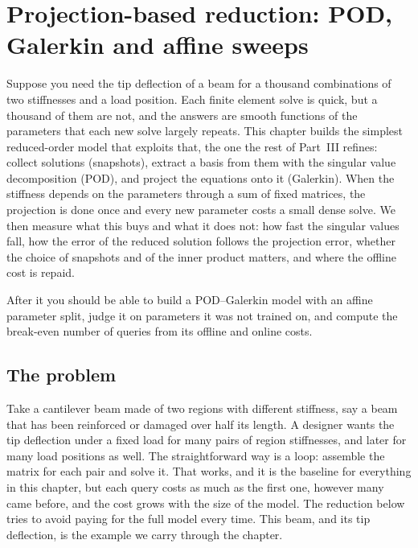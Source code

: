 \chapter{Projection-based reduction: POD, Galerkin and affine sweeps}\label{ch:pod}

\begin{tcolorbox}[colback=hpale,colframe=hnavy!60,coltitle=white,colbacktitle=hnavy!85,title={In this chapter}]
Suppose you need the tip deflection of a beam for a thousand combinations of two stiffnesses and a load position. Each finite element solve is quick, but a thousand of them are not, and the answers are smooth functions of the parameters that each new solve largely repeats. This chapter builds the simplest reduced-order model that exploits that, the one the rest of Part~III refines: collect solutions (snapshots), extract a basis from them with the singular value decomposition (POD), and project the equations onto it (Galerkin). When the stiffness depends on the parameters through a sum of fixed matrices, the projection is done once and every new parameter costs a small dense solve. We then measure what this buys and what it does not: how fast the singular values fall, how the error of the reduced solution follows the projection error, whether the choice of snapshots and of the inner product matters, and where the offline cost is repaid.\par\smallskip
After it you should be able to build a POD--Galerkin model with an affine parameter split, judge it on parameters it was not trained on, and compute the break-even number of queries from its offline and online costs.
\end{tcolorbox}

\section{The problem}\label{sec:pod-problem}

Take a cantilever beam made of two regions with different stiffness, say a beam that has been reinforced or damaged over half its length. A designer wants the tip deflection under a fixed load for many pairs of region stiffnesses, and later for many load positions as well. The straightforward way is a loop: assemble the matrix for each pair and solve it. That works, and it is the baseline for everything in this chapter, but each query costs as much as the first one, however many came before, and the cost grows with the size of the model. The reduction below tries to avoid paying for the full model every time. This beam, and its tip deflection, is the example we carry through the chapter.


